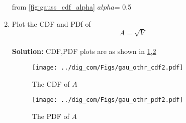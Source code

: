 \documentclass{article}
\numberwithin{equation}{subsection}
\numberwithin{figure}{subsection}
\newcommand{\solution}{\noindent \textbf{Solution: }}
\renewcommand\thesection{\arabic{section}}
\renewcommand\thesubsection{\thesection.\arabic{subsection}}
\begin{document}
\begin{enumerate}[label=\thesubsection.\arabic*,ref=\thesubsection.\arabic{figure}]
from \ref{fig:gauss_cdf_alpha}
$alpha$= 0.5
\item
\label{ch3_raleigh_sim}
Plot the CDF and PDf of
%
\begin{equation}
A = \sqrt{V}
\end{equation}\\
\solution
CDF,PDF plots are as shown in \ref{fig:gauss_othr_cdf2},\ref{fig:gauss_othr_pdf2}
\begin{center}
\end{center}
\begin{center}
\end{center}
\begin{figure}
\centering
\texttt{[image: ../dig\_com/Figs/gau\_othr\_cdf2.pdf]}     
\caption{The CDF of $A$ }
\label{fig:gauss_othr_cdf2}
\end{figure}
\begin{figure}
\centering
\texttt{[image: ../dig\_com/Figs/gau\_othr\_pdf2.pdf]}     
\caption{The PDF of $A$ }
\label{fig:gauss_othr_pdf2}
\end{figure}
\end{enumerate}
\end{document}
